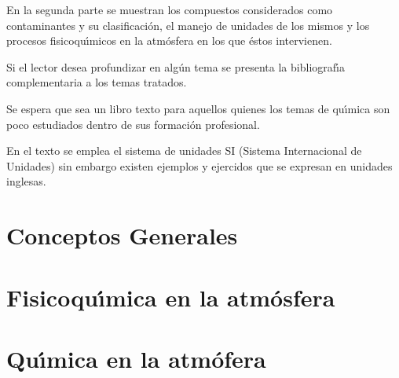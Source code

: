 \documentclass[spanish]{WileySix}
\begin{document}
\begin{preface}
 En la segunda parte se muestran los compuestos considerados como contaminantes y su clasificaci\'on, el manejo de unidades de los mismos y los procesos fisicoqu\'{\i}micos  en la atm\'osfera en los que \'estos intervienen.
 
 Si el lector desea profundizar en  alg\'un tema se presenta la bibliograf\'{\i}a complementaria a los temas tratados.
 
 Se espera que sea un libro texto para aquellos quienes los temas de qu\'{\i}mica son poco estudiados dentro de sus formaci\'on profesional.
 

En el texto se emplea el sistema de unidades SI (Sistema Internacional de Unidades)  sin embargo existen ejemplos y ejercidos que se expresan en unidades inglesas.
 \end{preface}
\renewcommand{\tablename}{Cuadro}

%
   \part{Conceptos Generales}




\part{Fisicoqu\'{\i}mica en la atm\'osfera}
  
   
    
\part{Qu\'{\i}mica en la atm\'ofera}
   
   
   
   
    \nocite{boyle1692general} \nocite{burton}\nocite{castellan}\nocite{Hein} 
    \nocite{maron}\nocite{reed2016acid}\nocite{wingrove}
%
\end{document}

